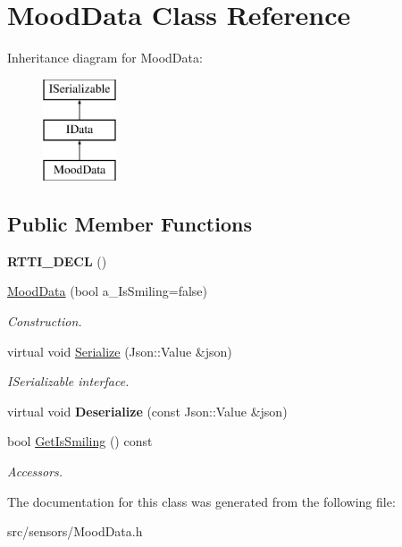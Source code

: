 \hypertarget{class_mood_data}{}\section{Mood\+Data Class Reference}
\label{class_mood_data}
Inheritance diagram for Mood\+Data\+:\begin{figure}[H]
\begin{center}
\leavevmode
\includegraphics[height=3.000000cm]{class_mood_data}
\end{center}
\end{figure}
\subsection*{Public Member Functions}
\begin{DoxyCompactItemize}
\item 
\mbox{\label{class_mood_data_aa59e835aa84ce5c36c988c6c34dca77d}} 
{\bfseries R\+T\+T\+I\+\_\+\+D\+E\+CL} ()
\item 
\mbox{\label{class_mood_data_aad525945028e61cd66f1f633f4534ec1}} 
\hyperlink{class_mood_data_aad525945028e61cd66f1f633f4534ec1}{Mood\+Data} (bool a\+\_\+\+Is\+Smiling=false)
\begin{DoxyCompactList}\small\item\em Construction. \end{DoxyCompactList}\item 
\mbox{\label{class_mood_data_ab557a7ae08b8b04df6a1ffc059673b93}} 
virtual void \hyperlink{class_mood_data_ab557a7ae08b8b04df6a1ffc059673b93}{Serialize} (Json\+::\+Value \&json)
\begin{DoxyCompactList}\small\item\em I\+Serializable interface. \end{DoxyCompactList}\item 
\mbox{\label{class_mood_data_a343e011346266e1dd66a2170dda25b64}} 
virtual void {\bfseries Deserialize} (const Json\+::\+Value \&json)
\item 
\mbox{\label{class_mood_data_a4bcb188e5fd66272a8c6e7f022dc1224}} 
bool \hyperlink{class_mood_data_a4bcb188e5fd66272a8c6e7f022dc1224}{Get\+Is\+Smiling} () const
\begin{DoxyCompactList}\small\item\em Accessors. \end{DoxyCompactList}\end{DoxyCompactItemize}


The documentation for this class was generated from the following file\+:\begin{DoxyCompactItemize}
\item 
src/sensors/Mood\+Data.\+h\end{DoxyCompactItemize}
